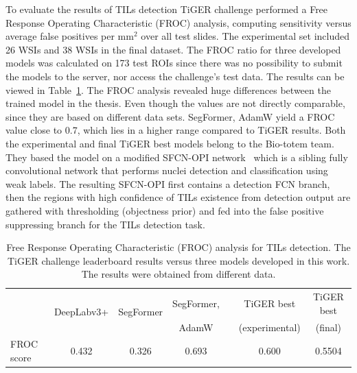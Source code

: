 To evaluate the results of TILs detection TiGER challenge performed a
Free Response Operating Characteristic (FROC) analysis, computing sensitivity
versus average false positives per mm$^2$ over all test slides.
The experimental set included 26 WSIs and 38 WSIs in the final dataset.
The FROC ratio for three developed models was calculated on 173 test ROIs
since there was no possibility to submit the models to the server, nor access
the challenge's test data. The results can be viewed in Table~\ref{tab:tils_compare}.
The FROC analysis revealed huge differences between the trained model in the thesis.
Even though the values are not directly comparable, since they are based on different
data sets. SegFormer, AdamW yield a FROC value close to 0.7, which lies in a higher
range compared to TiGER results.
Both the experimental and final TiGER best models belong to the Bio-totem team.
They based the model on a modified SFCN-OPI network~\cite{zhou2018sfcn} which
is a sibling fully convolutional network that performs nuclei detection and
classification using weak labels.  The resulting SFCN-OPI first contains a
detection FCN branch, then the regions with high confidence of TILs
existence from detection output are gathered with thresholding (objectness prior)
and fed into the false positive suppressing branch for the TILs detection task. 

\begin{table}[H]
    \centering
    \begin{tabular}{ l c c c c c c }
        \hline
         & \multirow{2}{*}{DeepLabv3+} & \multirow{2}{*}{SegFormer} & SegFormer, & & TiGER best & TiGER best\\
         &  &  & AdamW & & (experimental) & (final)\\
        \hline
        FROC score & 0.432 & 0.326 & 0.693 & & 0.600 & 0.5504 \\
        \hline
    \end{tabular}
\caption{\label{tab:tils_compare} Free Response Operating Characteristic (FROC)
analysis for TILs detection. The TiGER challenge leaderboard results versus three
models developed in this work. The results were obtained from different data.}
\end{table}

